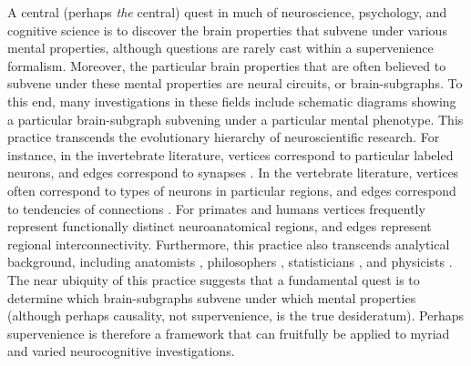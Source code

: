 \documentclass{article}
\begin{document}
A central (perhaps \emph{the} central) quest in much of neuroscience, psychology, and cognitive science is to discover the brain properties that subvene under various mental properties, although questions are rarely cast within a  supervenience formalism.  Moreover, the particular brain properties that are often believed to subvene under these mental properties are neural circuits, or brain-subgraphs.  To this end, many investigations in these fields include schematic diagrams showing a particular brain-subgraph subvening under a particular mental phenotype. This practice transcends the evolutionary hierarchy of neuroscientific research.  For instance, in the invertebrate literature, vertices correspond to particular labeled neurons, and edges correspond to synapses \cite{NorthGreenspan07}.  In the vertebrate literature, vertices often correspond to types of neurons in particular regions, and edges correspond to tendencies of connections \cite{Shepherd04}.  For primates \cite{Felleman_VanEssen91} and humans \cite{Mori05} vertices frequently represent functionally distinct neuroanatomical regions, and edges represent regional interconnectivity. Furthermore, this practice also transcends analytical background, including anatomists \cite{Abeles91}, philosophers \cite{Koch_Davis94}, statisticians \cite{Rao_Lewicki02}, and physicists \cite{Chow_Dalibard03}.  The near ubiquity of this practice suggests that a fundamental quest is to determine which brain-subgraphs subvene under which mental properties (although perhaps causality, not supervenience, is the true desideratum).  Perhaps supervenience is therefore a framework that can fruitfully be applied to myriad and varied neurocognitive investigations.



\end{document}

